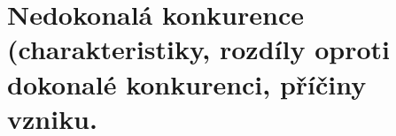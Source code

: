 \clearpage
\section{Nedokonalá konkurence (charakteristiky, rozdíly oproti dokonalé konkurenci, příčiny
vzniku.}